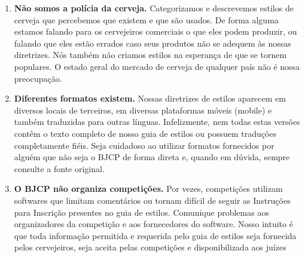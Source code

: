\begin{enumerate}
\item \textbf{Não somos a polícia da cerveja.} Categorizamos e descrevemos estilos de cerveja que percebemos que existem e que são usados. De forma alguma estamos falando para os cervejeiros comerciais o que eles podem produzir, ou falando que eles estão errados caso seus produtos não se adequem às nossas diretrizes. Nós também não criamos estilos na esperança de que se tornem populares. O estado geral do mercado de cerveja de qualquer país não é nossa preocupação.
\item \textbf{Diferentes formatos existem.} Nossas diretrizes de estilos aparecem em diversos locais de terceiros, em diversas plataformas móveis (mobile) e também traduzidas para outras línguas. Infelizmente, nem todas estas versões contêm o texto completo de nosso guia de estilos ou possuem traduções completamente fiéis. Seja cuidadoso ao utilizar formatos fornecidos por alguém que não seja o BJCP de forma direta e, quando em dúvida, sempre consulte a fonte original.
\item \textbf{O BJCP não organiza competições.} Por vezes, competições utilizam softwares que limitam comentários ou tornam difícil de seguir as Instruções para Inscrição presentes no guia de estilos. Comunique problemas aos organizadores da competição e aos fornecedores do software. Nosso intuito é que toda informação permitida e requerida pelo guia de estilos seja fornecida pelos cervejeiros, seja aceita pelas competições e disponibilizada aos juízes
\end{enumerate}
